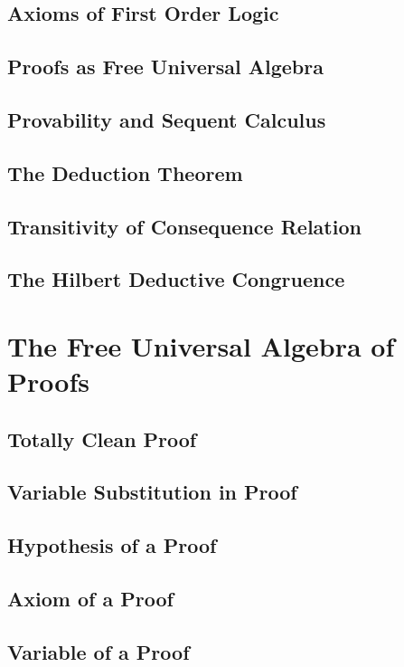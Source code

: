 \documentclass{report}
\begin{document}
    \subsection{Axioms of First Order Logic}
      
    \subsection{Proofs as Free Universal Algebra}
      
    \subsection{Provability and Sequent Calculus}
      
    \subsection{The Deduction Theorem}
      
    \subsection{Transitivity of Consequence Relation}
      
    \subsection{The Hilbert Deductive Congruence}
      
\section{The Free Universal Algebra of Proofs}
    \subsection{Totally Clean Proof}
      
    \subsection{Variable Substitution in Proof}
      
    \subsection{Hypothesis of a Proof}
      
    \subsection{Axiom of a Proof}
      
    \subsection{Variable of a Proof}
      
\end{document}
